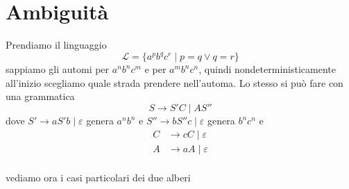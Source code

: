 \documentclass[12pt]{report}
\theoremstyle{definition}
\theoremstyle{regard}
\begin{document}
\section{Ambiguità}
Prendiamo il linguaggio
$$ \mathcal{L} = \{ a^p b^q c^r \mid p = q \vee q = r \} $$
sappiamo gli automi per $a^n b^n c^m$ e per $a^m b^n c^n$, %
quindi nondeterministicamente all'inizio scegliamo quale strada prendere nell'automa.
Lo stesso si può fare con una grammatica
$$ S \rightarrow S' C \mid A S'' $$
dove $S' \rightarrow a S' b \mid \varepsilon $ genera $a^n b^n$
e $S'' \rightarrow b S'' c \mid \varepsilon $ genera $b^n c^n$
e 
\begin{align*}
	C &\rightarrow c C \mid \varepsilon \\
	A &\rightarrow a A \mid \varepsilon \\
\end{align*}
\begin{center}
\end{center}
vediamo ora i casi particolari dei due alberi
\end{document}
